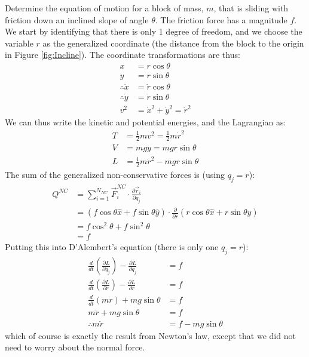 \begin{example}{0pt}{Determine the equation of motion for a block of mass, $m$, that is sliding with friction down an inclined slope of angle $\theta$. The friction force has a magnitude $f$.}{}
We start by identifying that there is only 1 degree of freedom, and we choose the variable $r$ as the generalized coordinate (the distance from the block to the origin in Figure \ref{fig:Incline}). The coordinate transformations are thus:
\begin{align*}
x&=r\cos{\theta}\nonumber\\
y&=r\sin{\theta}\nonumber\\
\therefore\dot{x}&=\dot{r}\cos{\theta}\nonumber\\
\therefore\dot{y}&=\dot{r}\sin{\theta}\nonumber\\
v^2&=\dot{x}^2+\dot{y}^2=\dot{r}^2
\end{align*}
We can thus write the kinetic and potential energies, and the Lagrangian as:
\begin{align*}
T&=\frac{1}{2}mv^2=\frac{1}{2}m\dot{r}^2\nonumber\\
V&=mgy=mgr\sin{\theta}\nonumber\\
L&=\frac{1}{2}m\dot{r}^2-mgr\sin{\theta}
\end{align*}
The sum of the generalized non-conservative forces is (using $q_j=r$):
\begin{align*}
Q^{NC}&=\sum_{i=1}^{N_{NC}}\vec{F}_i^{NC}\cdot\frac{\partial\vec{r}_i}{\partial q_j}\nonumber\\
&=(f\cos{\theta}\hat{x}+f\sin{\theta}\hat{y})\cdot\frac{\partial}{\partial r}(r\cos{\theta}\hat{x}+r\sin{\theta}\hat{y})\nonumber\\
&=f\cos^2{\theta}+f\sin^2{\theta}\nonumber\\
&=f
\end{align*}
Putting this into D'Alembert's equation (there is only one $q_j=r$):
\begin{align*}
\frac{d}{dt}\left(\frac{\partial L}{\partial \dot{q}_j} \right) - \frac{\partial L}{\partial q_j}&=f\nonumber\\
\frac{d}{dt}\left(\frac{\partial L}{\partial \dot{r}} \right) - \frac{\partial L}{\partial r}&=f\nonumber\\
\frac{d}{dt}(m\dot{r})+mg\sin{\theta}&=f\nonumber\\
m\ddot{r}+mg\sin{\theta}&=f\nonumber\\
\therefore m\ddot{r}&=f-mg\sin{\theta}
\end{align*}
which of course is exactly the result from Newton's law, except that we did not need to worry about the normal force.
\end{example}

